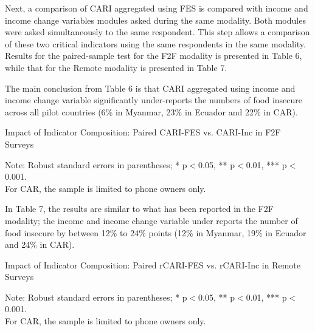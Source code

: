 \documentclass[11pt,harvard]{article}
\begin{document}
Next, a comparison of CARI aggregated using FES is compared with income and income change variables modules asked during the same modality. Both modules were asked simultaneously to the same respondent. This step allows a comparison of these two critical indicators using the same respondents in the same modality. Results for the paired-sample test for the F2F modality is presented in Table 6, while that for the Remote modality is presented in Table 7. 

The main conclusion from Table 6 is that CARI aggregated using income and income change variable significantly under-reports the numbers of food insecure across all pilot countries (6\% in Myanmar, 23\% in Ecuador and 22\% in CAR).


\begin{table}[htbp]
	\centering
	\begin{adjustbox}{max width=\textwidth}
		\begin{threeparttable}
			\caption{Impact of Indicator Composition: Paired CARI-FES vs. CARI-Inc in F2F Surveys}
			\scriptsize
			 
			\label{tab:Paired_F2F_CARI_FES_INC_All_Country}
			\begin{tablenotes}
				\item Note: Robust standard errors in parentheses; * p$<$0.05, ** p$<$0.01, *** p$<$0.001. \\
				For CAR, the sample is limited to phone owners only.
			\end{tablenotes}
		\end{threeparttable}
	\end{adjustbox}
\end{table}


In Table 7, the results are similar to what has been reported in the F2F modality; the income and income change variable under reports the number of food insecure by between 12\% to 24\% points (12\% in Myanmar, 19\% in Ecuador and 24\% in CAR). 


\begin{table}[htbp]
	\centering
	\begin{adjustbox}{max width=\textwidth}
		\begin{threeparttable}
			\caption{Impact of Indicator Composition: Paired rCARI-FES vs. rCARI-Inc in Remote Surveys}
			\scriptsize
			 
			\label{tab:Paired_RM_rCARI_FES_INC_All_Country}
			\begin{tablenotes}
				\item Note: Robust standard errors in parentheses; * p$<$0.05, ** p$<$0.01, *** p$<$0.001. \\
				For CAR, the sample is limited to phone owners only.
			\end{tablenotes}
		\end{threeparttable}
	\end{adjustbox}
\end{table}
\end{document}
